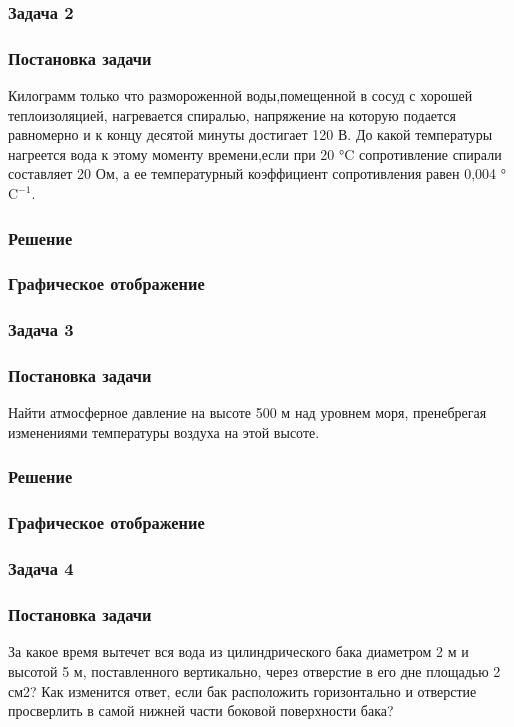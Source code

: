 \documentclass[a4paper,fleqn,14pt,titlepage]{extarticle}
\begin{document}
		\subsubsection{Задача 2}
			\subsubsection*{Постановка задачи}
				Килограмм только что размороженной воды,помещенной в сосуд с хорошей теплоизоляцией, нагревается спиралью, напряжение на которую подается равномерно и к концу десятой минуты достигает 120 В. До какой температуры нагреется вода к этому моменту времени,если при 20 °C сопротивление спирали составляет 20 Ом, а ее температурный коэффициент сопротивления равен 0,004 °$\text{C}^{-1}$.
			\subsubsection*{Решение}
			\subsubsection*{Графическое отображение}
		\subsubsection{Задача 3}
			\subsubsection*{Постановка задачи}
				Найти атмосферное давление на высоте 500 м над уровнем моря, пренебрегая изменениями температуры воздуха на этой высоте.
			\subsubsection*{Решение}
			\subsubsection*{Графическое отображение}
		\subsubsection{Задача 4}
			\subsubsection*{Постановка задачи}
				За какое время вытечет вся вода из цилиндрического бака диаметром 2 м и высотой 5 м, поставленного вертикально, через отверстие в его дне площадью 2 см2? Как изменится ответ, если бак расположить горизонтально и отверстие просверлить в самой нижней части боковой поверхности бака?
\end{document}
